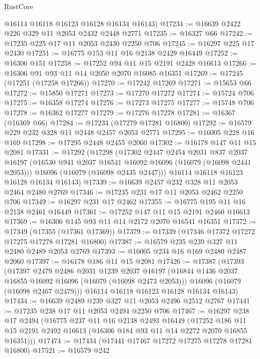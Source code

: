 \begin{lexlean}{RustCore}
\begin{coremodule}
      @16114
      @16118
      @16123
      @16128
      @16134
      @16143)
@17234 := @16639 @2422 @226 @329 @11 @2053 @2432 @2448 @2771
@17235 := @16327 @66
@17242 := @17235 @225 @17 @11 @2053 @2430 @2250 @706
@17245 := @16297 @225 @17 @2430
@17251 := @16775 @153 @11 @16 @2138 @2429 @16449
@17252 := @16306 @151
@17258 := @17252 @94 @11 @15 @2191 @2428 @16613
@17266 := @16306 @91 @93 @11 @14 @2050 @2070 @16085 @16351
@17269 := @17245 (@17251 (@17258 @17266))
@17270 := @17242 @17269
@17271 := @15653 @66
@17272 := @15850 @17271
@17273 := @17270 @17272
@17274 := @15724 @706
@17275 := @16358 @17274
@17276 := @17273 @17275
@17277 := @15748 @706
@17278 := @16362 @17277
@17279 := @17276 @17278
@17281 := @16367 (@16369 @66)
@17284 := @17234 (@17279 @17281 @16800)
@17292 := @16579 @229 @232 @328 @11 @2448 @2457 @2053 @2771
@17295 := @16005 @228 @16 @169
@17298 := @17295 @2448 @2455 @2060
@17302 := @16178 @147 @11 @15 @2081
@17331 := @17292
    (@17298
      (@17302
        @2447
        @2454
        @2031
        @837
        @2037
        @16197
        (@16530 @941 @2037 @16541 @16092 @16096 (@16079 (@16098 @2441 @2053)))
        @16096
        (@16079 (@16098 @2435 @2447)))
      @16114
      @16118
      @16123
      @16128
      @16134
      @16143)
@17339 := @16639 @2457 @232 @328 @11 @2053 @2464 @2480 @2769
@17346 := @17235 @231 @17 @11 @2053 @2462 @2250 @706
@17349 := @16297 @231 @17 @2462
@17355 := @16775 @195 @11 @16 @2138 @2461 @16449
@17361 := @17252 @147 @11 @15 @2191 @2460 @16613
@17369 := @16306 @145 @93 @11 @14 @2172 @2070 @16541 @16351
@17372 := @17349 (@17355 (@17361 @17369))
@17379 := @17339 (@17346 @17372 @17272 @17275 @17278 @17281 @16800)
@17387 := @16579 @235 @239 @327 @11 @2480 @2489 @2053 @2769
@17393 := @16005 @234 @16 @169 @2480 @2487 @2060
@17397 := @16178 @186 @11 @15 @2081
@17426 := @17387
    (@17393
      (@17397
        @2479
        @2486
        @2031
        @1239
        @2037
        @16197
        (@16844 @1436 @2037 @16855 @16092 @16096 (@16079 (@16098 @2473 @2053)))
        @16096
        (@16079 (@16098 @2467 @2479)))
      @16114
      @16118
      @16123
      @16128
      @16134
      @16143)
@17434 := @16639 @2489 @239 @327 @11 @2053 @2496 @2512 @2767
@17441 := @17235 @238 @17 @11 @2053 @2494 @2250 @706
@17467 := @16297
    @238
    @17
    @2494
    (@16775
      @237
      @11
      @16
      @2138
      @2493
      @16449
      (@17252 @186 @11 @15 @2191 @2492 @16613 (@16306 @184 @93 @11 @14 @2272 @2070 @16855 @16351)))
@17474 := @17434 (@17441 @17467 @17272 @17275 @17278 @17281 @16800)
@17521 := @16579
    @242

\end{coremodule}
\end{lexlean}
